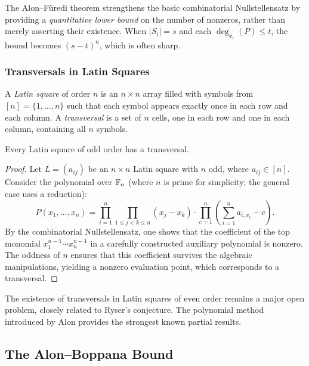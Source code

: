 \begin{remark}
The Alon--F\"uredi theorem strengthens the basic combinatorial Nullstellensatz by providing a \emph{quantitative lower bound} on the number of nonzeros, rather than merely asserting their existence. When $|S_i| = s$ and each $\deg_{x_i}(P) \leq t$, the bound becomes $(s - t)^n$, which is often sharp.
\end{remark}

\subsubsection*{Transversals in Latin Squares}

A \emph{Latin square} of order $n$ is an $n \times n$ array filled with symbols from $[n] = \{1, \ldots, n\}$ such that each symbol appears exactly once in each row and each column. A \emph{transversal} is a set of $n$ cells, one in each row and one in each column, containing all $n$ symbols.

\begin{theorem}[Alon, 1999]
Every Latin square of odd order has a transversal.
\end{theorem}

\begin{proof}
Let $L = (a_{ij})$ be an $n \times n$ Latin square with $n$ odd, where $a_{ij} \in [n]$. Consider the polynomial over $\mathbb{F}_n$ (where $n$ is prime for simplicity; the general case uses a reduction):
\[
P(x_1, \ldots, x_n) = \prod_{i=1}^{n} \prod_{1 \leq j < k \leq n} (x_j - x_k) \cdot \prod_{c=1}^{n} \left(\sum_{i=1}^{n} a_{i,x_i} - c\right).
\]
By the combinatorial Nullstellensatz, one shows that the coefficient of the top monomial $x_1^{n-1} \cdots x_n^{n-1}$ in a carefully constructed auxiliary polynomial is nonzero. The oddness of $n$ ensures that this coefficient survives the algebraic manipulations, yielding a nonzero evaluation point, which corresponds to a transversal.
\end{proof}

\begin{remark}
The existence of transversals in Latin squares of even order remains a major open problem, closely related to Ryser's conjecture. The polynomial method introduced by Alon provides the strongest known partial results.
\end{remark}

\subsection{The Alon--Boppana Bound}

